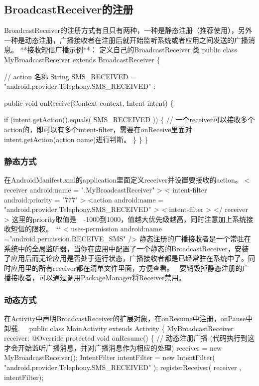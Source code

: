\documentclass[9pt, b5paper]{article}
\begin{document}
\subsection{BroadcastReceiver的注册}
\label{sec-13-3}
BroadcastReceiver的注册方式有且只有两种，一种是静态注册（推荐使用），另外一种是动态注册，广播接收者在注册后就开始监听系统或者应用之间发送的广播消息。
**接收短信广播示例**：
定义自己的BroadcastReceiver 类
public class MyBroadcastReceiver extends BroadcastReceiver \{

// action 名称
String SMS\_RECEIVED = "android.provider.Telephony.SMS\_RECEIVED" ;

public void onReceive(Context context, Intent intent) \{

       if (intent.getAction().equals( SMS\_RECEIVED )) \{
           // 一个receiver可以接收多个action的，即可以有多个intent-filter，需要在onReceive里面对intent.getAction(action name)进行判断。
       \}
    \}
\}
\subsubsection{静态方式}
\label{sec-13-3-1}
在AndroidManifest.xml的application里面定义receiver并设置要接收的action。
< receiver android:name = ".MyBroadcastReceiver" > 
 < intent-filter android:priority = "777" >             
<action android:name = "android.provider.Telephony.SMS\_RECEIVED" \emph{>
<} intent-filter > 
</ receiver >
这里的priority取值是　-1000到1000，值越大优先级越高，同时注意加上系统接收短信的限权。
``` 
< uses-permission android:name ="android.permission.RECEIVE\_SMS" />
静态注册的广播接收者是一个常驻在系统中的全局监听器，当你在应用中配置了一个静态的BroadcastReceiver，安装了应用后而无论应用是否处于运行状态，广播接收者都是已经常驻在系统中了。同时应用里的所有receiver都在清单文件里面，方便查看。　
要销毁掉静态注册的广播接收者，可以通过调用PackageManager将Receiver禁用。
\subsubsection{动态方式}
\label{sec-13-3-2}
在Activity中声明BroadcastReceiver的扩展对象，在onResume中注册，onPause中卸载.
　public class MainActivity extends Activity \{
    MyBroadcastReceiver receiver;
    @Override
     protected void onResume() \{
        // 动态注册广播 (代码执行到这才会开始监听广播消息，并对广播消息作为相应的处理)
        receiver = new MyBroadcastReceiver();
        IntentFilter intentFilter = new IntentFilter( "android.provider.Telephony.SMS\_RECEIVED" );
        registerReceiver( receiver , intentFilter);
\end{document}
